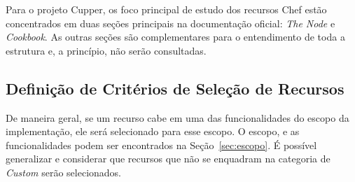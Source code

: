 Para o projeto Cupper, os foco principal de estudo dos recursos Chef estão
concentrados em duas seções principais na documentação oficial: \textit{The Node} e
\textit{Cookbook}. As outras seções são complementares para o entendimento de toda
a estrutura e, a princípio, não serão consultadas.

\subsection{Definição de Critérios de Seleção de Recursos}
\label{sec:defcritrecurso}

De maneira geral, se um recurso cabe em uma das funcionalidades do escopo da
implementação, ele será selecionado para esse escopo. O escopo, e as
funcionalidades podem ser encontrados na Seção~\ref{sec:escopo}. É possível
generalizar e considerar que recursos que não se enquadram na categoria de
\textit{Custom} serão selecionados.
